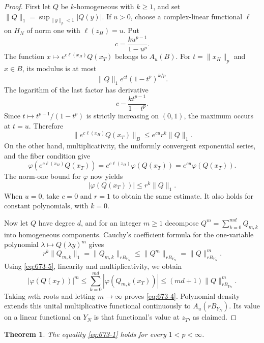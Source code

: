\documentclass[11pt,a4paper]{article}
\newtheorem{theorem}{Theorem}[section]
\theoremstyle{remark}
\begin{document}
\begin{proof}
First let $Q$ be $k$-homogeneous with $k\ge1$, and set
$\|Q\|_1=\sup_{\|y\|_p<1}|Q(y)|$.
If $u>0$, choose a complex-linear functional $\ell$ on $H_N$ of
norm one with $\ell(z_H)=u$.  Put
\[
 c=\frac{k u^{p-1}}{1-u^p}.
\]
The function $x\mapsto e^{c\ell(x_H)}Q(x_T)$ belongs to $A_u(B)$.
For $t=\|x_H\|_p$ and $x\in B$, its modulus is at most
\[
 \|Q\|_1 e^{ct}(1-t^p)^{k/p}.
\]
The logarithm of the last factor has derivative
\[
 c-\frac{k t^{p-1}}{1-t^p}.
\]
Since $t\mapsto t^{p-1}/(1-t^p)$ is strictly increasing on $(0,1)$,
the maximum occurs at $t=u$.  Therefore
\[
 \|e^{c\ell(x_H)}Q(x_T)\|_B
 \le e^{cu}r^k\|Q\|_1.
\]
On the other hand, multiplicativity, the uniformly convergent
exponential series, and the fiber condition give
\[
 \varphi(e^{c\ell(x_H)}Q(x_T))
 =e^{c\ell(z_H)}\varphi(Q(x_T))
 =e^{cu}\varphi(Q(x_T)).
\]
The norm-one bound for $\varphi$ now yields
\begin{equation}
 |\varphi(Q(x_T))|\le r^k\|Q\|_1.
 \label{eq:673-5}
\end{equation}
When $u=0$, take $c=0$ and $r=1$ to obtain the same estimate.
It also holds for constant polynomials, with $k=0$.

Now let $Q$ have degree $d$, and for an integer $m\ge1$ decompose
$Q^m=\sum_{k=0}^{md}Q_{m,k}$ into homogeneous components.
Cauchy's coefficient formula for the one-variable polynomial
$\lambda\mapsto Q(\lambda y)^m$ gives
\[
 r^k\|Q_{m,k}\|_1
 =\|Q_{m,k}\|_{rB_{Y_N}}
 \le\|Q^m\|_{rB_{Y_N}}
 =\|Q\|_{rB_{Y_N}}^m.
\]
Using \eqref{eq:673-5}, linearity and multiplicativity, we obtain
\[
 |\varphi(Q(x_T))|^m
 \le\sum_{k=0}^{md}|\varphi(Q_{m,k}(x_T))|
 \le(md+1)\|Q\|_{rB_{Y_N}}^m.
\]
Taking $m$th roots and letting $m\to\infty$ proves \eqref{eq:673-4}.
Polynomial density extends this unital multiplicative functional
continuously to $A_u(rB_{Y_N})$.  Its value on a linear functional
on $Y_N$ is that functional's value at $z_T$, as claimed.
\end{proof}

\begin{theorem}
The equality \eqref{eq:673-1} holds for every $1<p<\infty$.
\end{theorem}
\end{document}
